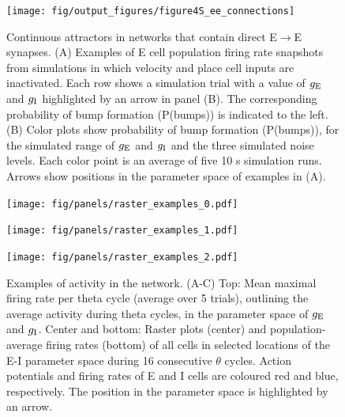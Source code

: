 \documentclass[a4paper,12pt]{article}
\newcommand{\ssc}[3]{\ensuremath{#1_{\text{#2}_{\text{#3}}}}}
\newcommand{\gE      }{\ssc{g}      {\scriptsize{E}}{}}
\newcommand{\gI      }{\ssc{g}      {\scriptsize{I}}{}}
\begin{document}
\clearpage

\begin{figure}[p]
    \internallinenumbers
    \centering
        \texttt{[image: fig/output\_figures/figure4S\_ee\_connections]}
    \caption{Continuous attractors in networks that contain direct
    E$\rightarrow$E synapses. (A) Examples of E cell population firing rate
    snapshots from simulations in which velocity and place cell inputs are
    inactivated. Each row shows a simulation trial with a value of $\gE$ and
    $\gI$
    highlighted by an arrow in panel (B). The corresponding probability of bump
    formation (P(bumps)) is indicated to the left.  (B) Color plots show
    probability of bump formation (P(bumps)), for the simulated range of $\gE$ and
    $\gI$ and the three simulated noise levels. Each color point is an average of
    five 10 s simulation runs. Arrows show positions in the parameter space of
    examples in (A).}
\end{figure}

\clearpage

\begin{figure}[p]
    \centering
        \texttt{[image: fig/panels/raster\_examples\_0.pdf]}
\end{figure}

\begin{figure}[p]
    \centering
        \texttt{[image: fig/panels/raster\_examples\_1.pdf]}
\end{figure}

\begin{figure}[p]
    \centering
        \texttt{[image: fig/panels/raster\_examples\_2.pdf]}
\end{figure}

\clearpage

\setcounter{figure}{0}
\renewcommand{\figurename}{Figure 5 - figure supplement}

\begin{figure}[H]
    \internallinenumbers
    \caption{Examples of activity in the network. (A-C) Top: Mean maximal
    firing rate per theta cycle (average over 5 trials), outlining the average
    activity during theta cycles, in the parameter space of $\gE$ and $\gI$.
    Center and bottom: Raster plots (center) and population-average firing
    rates (bottom) of all cells in selected locations of the E-I parameter
    space during 16 consecutive $\theta$ cycles. Action potentials and firing
    rates of E and I cells are coloured red and blue, respectively. The position
    in the parameter space is highlighted by an arrow.}
\end{figure}
\end{document}
